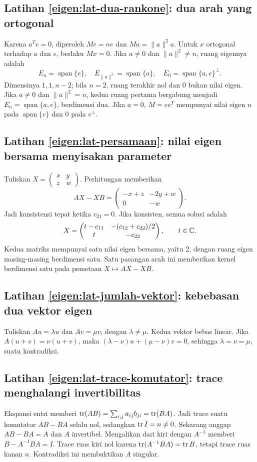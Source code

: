 \subsection*{Latihan \ref{eigen:lat-dua-rankone}: dua arah yang ortogonal}
Karena $a^Te=0$, diperoleh $Me=ne$ dan $Ma=\|a\|^2a$.
Untuk $x$ ortogonal terhadap $a$ dan $e$, berlaku $Mx=0$.
Jika $a\ne0$ dan $\|a\|^2\ne n$, ruang eigennya adalah
\[
    E_n=\operatorname{span}\{e\},\quad
    E_{\|a\|^2}=\operatorname{span}\{a\},\quad
    E_0=\operatorname{span}\{a,e\}^{\perp}.
\]
Dimensinya $1,1,n-2$; bila $n=2$, ruang terakhir nol dan $0$ bukan nilai eigen.
Jika $a\ne0$ dan $\|a\|^2=n$, kedua ruang pertama bergabung menjadi
$E_n=\operatorname{span}\{a,e\}$, berdimensi dua.
Jika $a=0$, $M=ee^T$ mempunyai nilai eigen $n$ pada
$\operatorname{span}\{e\}$ dan $0$ pada $e^\perp$.

\subsection*{Latihan \ref{eigen:lat-persamaan}: nilai eigen bersama menyisakan parameter}
Tuliskan $X=\begin{pmatrix}x&y\\z&w\end{pmatrix}$.
Perhitungan memberikan
\[
    AX-XB=\begin{pmatrix}-x+z&-2y+w\\0&-w\end{pmatrix}.
\]
Jadi konsistensi tepat ketika $c_{21}=0$. Jika konsisten, semua solusi adalah
\[
    X=\begin{pmatrix}
        t-c_{11}&-(c_{12}+c_{22})/2\\t&-c_{22}
    \end{pmatrix},\qquad t\in\mathbb{C}.
\]
Kedua matriks mempunyai satu nilai eigen bersama, yaitu $2$, dengan
ruang eigen masing-masing berdimensi satu. Satu pasangan arah ini
memberikan kernel berdimensi satu pada pemetaan $X\mapsto AX-XB$.

\subsection*{Latihan \ref{eigen:lat-jumlah-vektor}: kebebasan dua vektor eigen}
Tuliskan $Au=\lambda u$ dan $Av=\mu v$, dengan $\lambda\ne\mu$.
Kedua vektor bebas linear. Jika $A(u+v)=\nu(u+v)$, maka
$(\lambda-\nu)u+(\mu-\nu)v=0$, sehingga
$\lambda=\nu=\mu$, suatu kontradiksi.

\subsection*{Latihan \ref{eigen:lat-trace-komutator}: trace menghalangi invertibilitas}
Ekspansi entri memberi
$\operatorname{tr}(AB)=\sum_{i,j}a_{ij}b_{ji}=\operatorname{tr}(BA)$.
Jadi trace suatu komutator $AB-BA$ selalu nol,
sedangkan $\operatorname{tr} I=n\ne0$.
Sekarang anggap $AB-BA=A$ dan $A$ invertibel.
Mengalikan dari kiri dengan $A^{-1}$ memberi
$B-A^{-1}BA=I$. Trace ruas kiri nol karena
$\operatorname{tr}(A^{-1}BA)=\operatorname{tr} B$, tetapi trace ruas kanan $n$.
Kontradiksi ini membuktikan $A$ singular.

